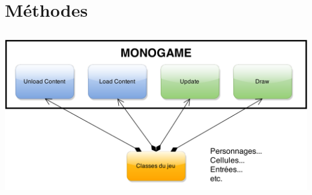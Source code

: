 \documentclass{beamer}
\begin{document}
\section{Méthodes}
\subsection{}

\begin{frame}
\begin{center}
\includegraphics[width=1\textwidth]{img/pres_boucles.png}\\
\end{center}
\end{frame}
\end{document}
